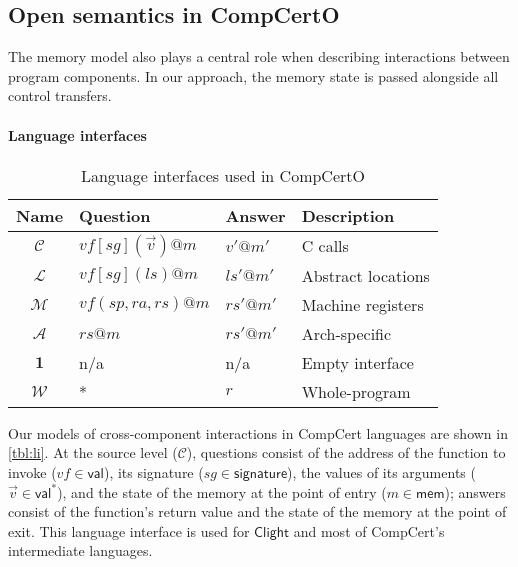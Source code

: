 \documentclass[sigplan,10pt,review]{acmart}
\newcommand{\figsize}{\small}
\newcommand{\kw}[1]{\ensuremath{ \mathsf{#1} }}
\begin{document}


\subsection{Open semantics in CompCertO} \label{sec:sem:open} %

The memory model also plays a central role
when describing interactions between program components.
In our approach, %
the memory state is passed %
alongside all control transfers.

\paragraph{Language interfaces} %

\begin{table} %
  \caption{Language interfaces used in CompCertO}
  \label{tbl:li}
  \figsize
  \begin{tabular}{clll}
    \hline
    Name & Question & Answer & Description \\
    \hline
    $\mathcal{C}$ &
      $\mathit{vf}[\mathit{sg}](\vec{v})@m$ & $v'@m'$ &
      C calls \\
    $\mathcal{L}$ &
      $\mathit{vf}[\mathit{sg}](\mathit{ls})@m$ & $\mathit{ls}'@m'$ &
      Abstract locations \\
    $\mathcal{M}$ &
      $\mathit{vf}(\mathit{sp},\mathit{ra},\mathit{rs})@m$ & $\mathit{rs}'@m'$ &
      Machine registers \\
    $\mathcal{A}$ &
      $\mathit{rs}@m$ & $\mathit{rs}'@m'$ &
      Arch-specific \\
    $\mathbf{1}$ & n/a & n/a &
      Empty interface \\
    $\mathcal{W}$ & * & $r$ &
      Whole-program \\
    \hline
  \end{tabular}
\end{table}

Our models of cross-component interactions in CompCert languages
are shown in \autoref{tbl:li}.
At the source level ($\mathcal{C}$),
questions consist of
the address of the function to invoke
($\mathit{vf} \in \kw{val}$),
its signature
($\mathit{sg} \in \kw{signature}$),
the values of its arguments
($\vec{v} \in \kw{val}^*$),
and the state of the memory at the point of entry
($m \in \kw{mem}$);
answers
consist of the function's return value
and the state of the memory at the point of exit.
This language interface is used for \kw{Clight} and
most of CompCert's intermediate languages.
\end{document}

